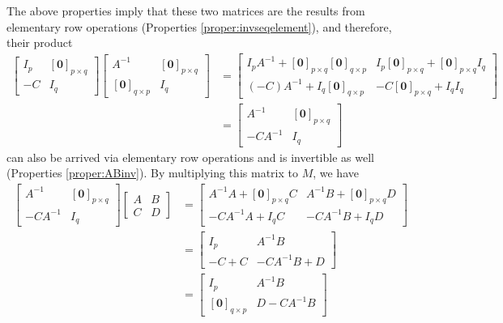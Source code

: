 The above properties imply that these two matrices are the results from elementary row operations (Properties \ref{proper:invseqelement}), and therefore, their product
\begin{align*}
\begin{bmatrix}
I_p & [\textbf{0}]_{p \times q} \\
-C & I_q
\end{bmatrix}
\begin{bmatrix}
A^{-1} & [\textbf{0}]_{p\times q} \\
[\textbf{0}]_{q\times p} & I_q
\end{bmatrix}
&=
\begin{bmatrix}
I_pA^{-1} + [\textbf{0}]_{p\times q}[\textbf{0}]_{q\times p} & I_p[\textbf{0}]_{p\times q} + [\textbf{0}]_{p\times q}I_q \\
(-C)A^{-1} + I_q[\textbf{0}]_{q \times p} & -C[\textbf{0}]_{p \times q} + I_qI_q
\end{bmatrix} \\
&=
\begin{bmatrix}
A^{-1} & [\textbf{0}]_{p\times q} \\
-CA^{-1} & I_q
\end{bmatrix}
\end{align*}
can also be arrived via elementary row operations and is invertible as well (Properties \ref{proper:ABinv}). By multiplying this matrix to $M$, we have
\begin{align*}
\begin{bmatrix}
A^{-1} & [\textbf{0}]_{p\times q} \\
-CA^{-1} & I_q
\end{bmatrix}
\begin{bmatrix}
A & B \\
C & D
\end{bmatrix} &= 
\begin{bmatrix}
A^{-1}A + [\textbf{0}]_{p\times q}C & A^{-1}B + [\textbf{0}]_{p \times q}D \\
-CA^{-1}A + I_qC & - CA^{-1}B + I_qD  
\end{bmatrix} \\
&= 
\begin{bmatrix}
I_p & A^{-1}B \\
-C + C & - CA^{-1}B + D  
\end{bmatrix} \\
&=
\begin{bmatrix}
I_p & A^{-1}B \\
[\textbf{0}]_{q\times p} & D - CA^{-1}B 
\end{bmatrix}
\end{align*}
